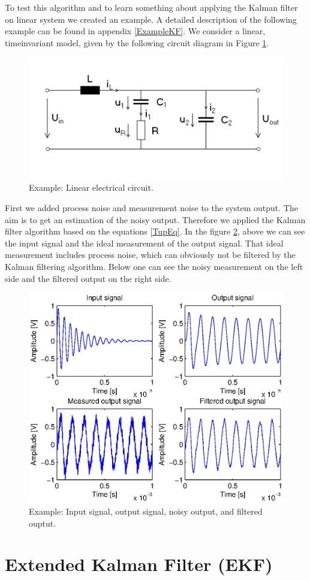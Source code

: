 To test this algorithm and to learn something about applying the Kalman filter on linear system we created an example. A detailed description of the following example can be found in appendix \ref{ExampleKF}. \newline 
We consider a linear, timeinvariant model, given by the following circuit diagram in Figure \ref{KFcircuit}.
\begin{figure}[htbp]
	\centering
    	\includegraphics[width=12cm]{./3_KalmanFilter/circuit_diagram}
  	\caption{Example: Linear electrical circuit.}
  	\label{KFcircuit}
\end{figure}
First we added process noise and measurement noise to the system output. The aim is to get an estimation of the noisy output. Therefore we applied the Kalman filter algorithm based on the equations \ref{TupEq}. In the figure \ref{KFchart}, above we can see the input signal and the ideal measurement of the output signal. That ideal measurement includes process noise, which can obviously not be filtered by the Kalman filtering algorithm. Below one can see the noisy measurement on the left side and the filtered output on the right side.
\begin{figure}[htbp]
	\centering
    	\includegraphics[width=12cm]{./3_KalmanFilter/KFchart}
  	\caption{Example: Input signal, output signal, noisy output, and filtered ouptut.}
  	\label{KFchart}
\end{figure}

\section{Extended Kalman Filter (EKF)}

